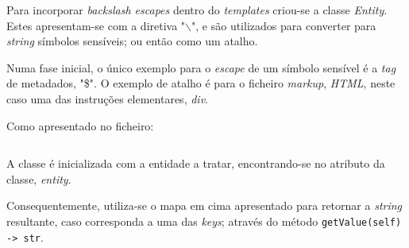 \documentclass[../relatorio.tex]{subfiles}
\begin{document}
    Para incorporar \textit{backslash escapes} dentro 
    do \textit{templates} criou-se a classe \textit{Entity}.
    Estes apresentam-se com a diretiva "$\backslash$", 
    e são utilizados para converter para \textit{string}
    símbolos sensíveis; ou então como um atalho.

    Numa fase inicial, o único exemplo para o \textit{escape}
    de um símbolo sensível é a \textit{tag} de metadados, "\$".
    O exemplo de atalho é para o ficheiro \textit{markup}, \textit{HTML},
    neste caso uma das instruções elementares, \textit{div}.

    Como apresentado no ficheiro:
    \inputminted[firstline=8, lastline=11]{py}{../modules/Entity.py}

    A classe é inicializada com a entidade a tratar, encontrando-se no 
    atributo da classe, \textit{entity}.

    Consequentemente, utiliza-se o mapa em cima apresentado para 
    retornar a \textit{string} resultante, caso corresponda a uma das \textit{keys};
    através do método \texttt{getValue(self) -> str}.
\end{document}
